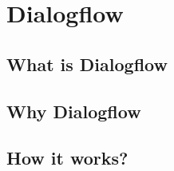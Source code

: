 \chapter{Dialogflow}

\section{What is Dialogflow}

\section{Why Dialogflow}

\section{How it works?}
